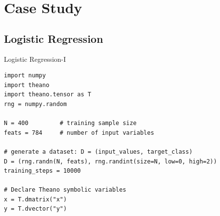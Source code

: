\documentclass[a4paper,9pt]{beamer}
\begin{document}

\section{Case Study}
\subsection{Logistic Regression}
\begin{frame}[fragile]{Logistic Regression-I}


\begin{verbatim}
import numpy
import theano
import theano.tensor as T
rng = numpy.random

N = 400         # training sample size
feats = 784     # number of input variables

# generate a dataset: D = (input_values, target_class)
D = (rng.randn(N, feats), rng.randint(size=N, low=0, high=2))
training_steps = 10000

# Declare Theano symbolic variables
x = T.dmatrix("x")
y = T.dvector("y")

\end{verbatim}
\end{frame}
\end{document}
